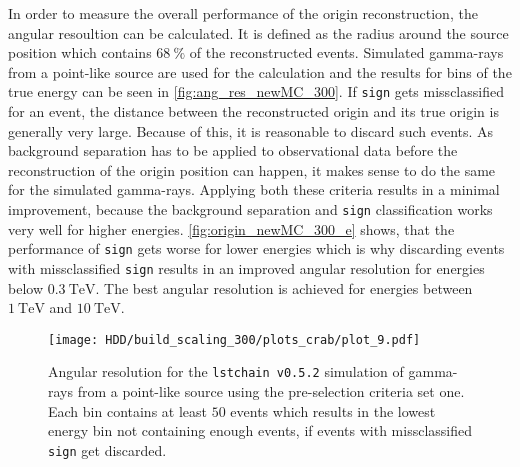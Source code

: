 In order to measure the overall performance of the origin reconstruction, the angular resoultion can be calculated.
It is defined as the radius around the source position which contains $\SI{68}{\percent}$ of the reconstructed events.
Simulated gamma-rays from a point-like source are used for the calculation and the results for bins of the true energy can be seen in \autoref{fig:ang_res_newMC_300}.
If \texttt{sign} gets missclassified for an event, the distance between the reconstructed origin and its true origin is generally very large.
Because of this, it is reasonable to discard such events.
As background separation has to be applied to observational data before the reconstruction of the origin position can happen, it makes sense to do the same
for the simulated gamma-rays.
Applying both these criteria results in a minimal improvement, because the background separation and \texttt{sign} classification works very well for higher energies.
\autoref{fig:origin_newMC_300_e} shows, that the performance of \texttt{sign} gets worse for lower energies which is why discarding events with missclassified  
\texttt{sign} results in an improved angular resolution for energies below $\SI{0.3}{\tera\electronvolt}$.
The best angular resolution is achieved for energies between $\SI{1}{\tera\electronvolt}$ and $\SI{10}{\tera\electronvolt}$.
\begin{figure}
    \centering
    \texttt{[image: HDD/build\_scaling\_300/plots\_crab/plot\_9.pdf]}
    \caption{Angular resolution for the \texttt{lstchain v0.5.2} simulation of gamma-rays from a point-like source using the pre-selection criteria set one.
        Each bin contains at least $\num{50}$ events which results in the lowest energy bin not containing enough events, if events with missclassified \texttt{sign} 
        get discarded.
    }
    \label{fig:ang_res_newMC_300}
\end{figure}

